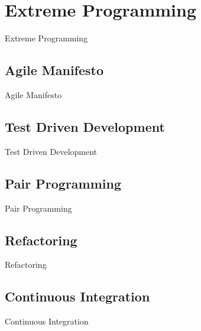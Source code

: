 \section{Extreme Programming}\label{sec:extreme-programming}
Extreme Programming

\subsection{Agile Manifesto}\label{subsec:agile-manifesto2}
Agile Manifesto

\subsection{Test Driven Development}\label{subsec:test-driven-development}
Test Driven Development

\subsection{Pair Programming}\label{subsec:pair-programming}
Pair Programming

\subsection{Refactoring}\label{subsec:refactoring}
Refactoring

\subsection{Continuous Integration}\label{subsec:continuous-integration}
Continuous Integration
